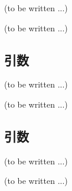 




(to be written ...)


(to be written ...)


\subsection{引数\TBW}
(to be written ...)



(to be written ...)


\subsection{引数\TBW}
(to be written ...)



(to be written ...)


